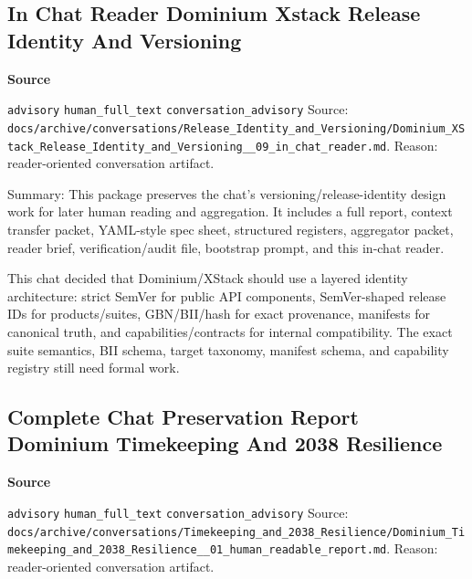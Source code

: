 \documentclass[9pt,a4paper,openany]{book}
\newcommand{\vonecallout}[3]{\par\medskip\noindent\begingroup\setlength{\fboxsep}{7pt}\colorbox{DomCalloutBg}{\parbox{0.94\linewidth}{\textbf{\textcolor{#1}{#2}}\par #3}}\endgroup\par\medskip}
\begin{document}
\subsection{In Chat Reader Dominium Xstack Release Identity And Versioning}

\vonecallout{DomSlate}{Source}{\texttt{advisory} \texttt{human\_\allowbreak{}full\_\allowbreak{}text} \texttt{conversation\_\allowbreak{}advisory} Source: \texttt{docs/\allowbreak{}archive/\allowbreak{}conversations/\allowbreak{}Release\_\allowbreak{}Identity\_\allowbreak{}and\_\allowbreak{}Versioning/\allowbreak{}Dominium\_\allowbreak{}XStack\_\allowbreak{}Release\_\allowbreak{}Identity\_\allowbreak{}and\_\allowbreak{}Versioning\_\allowbreak{}\_\allowbreak{}09\_\allowbreak{}in\_\allowbreak{}chat\_\allowbreak{}reader.\allowbreak{}md}.\allowbreak{} Reason: reader-\allowbreak{}oriented conversation artifact.\allowbreak{}}

Summary: This package preserves the chat's versioning/\allowbreak{}release-\allowbreak{}identity design work for later human reading and aggregation.\allowbreak{} It includes a full report, context transfer packet, YAML-\allowbreak{}style spec sheet, structured registers, aggregator packet, reader brief, verification/\allowbreak{}audit file, bootstrap prompt, and this in-\allowbreak{}chat reader.\allowbreak{}


This chat decided that Dominium/\allowbreak{}XStack should use a layered identity architecture: strict SemVer for public API components, SemVer-\allowbreak{}shaped release IDs for products/\allowbreak{}suites, GBN/\allowbreak{}BII/\allowbreak{}hash for exact provenance, manifests for canonical truth, and capabilities/\allowbreak{}contracts for internal compatibility.\allowbreak{} The exact suite semantics, BII schema, target taxonomy, manifest schema, and capability registry still need formal work.\allowbreak{}



\subsection{Complete Chat Preservation Report Dominium Timekeeping And 2038 Resilience}

\vonecallout{DomSlate}{Source}{\texttt{advisory} \texttt{human\_\allowbreak{}full\_\allowbreak{}text} \texttt{conversation\_\allowbreak{}advisory} Source: \texttt{docs/\allowbreak{}archive/\allowbreak{}conversations/\allowbreak{}Timekeeping\_\allowbreak{}and\_\allowbreak{}2038\_\allowbreak{}Resilience/\allowbreak{}Dominium\_\allowbreak{}Timekeeping\_\allowbreak{}and\_\allowbreak{}2038\_\allowbreak{}Resilience\_\allowbreak{}\_\allowbreak{}01\_\allowbreak{}human\_\allowbreak{}readable\_\allowbreak{}report.\allowbreak{}md}.\allowbreak{} Reason: reader-\allowbreak{}oriented conversation artifact.\allowbreak{}}
\end{document}
